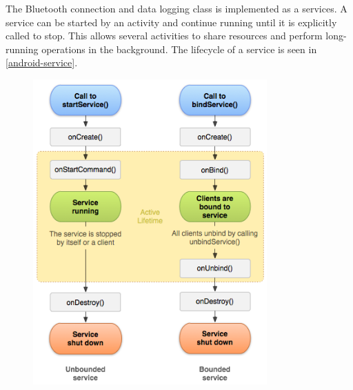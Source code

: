 The Bluetooth connection and data logging class is implemented as a services\cite{android-service}. A service can be started by an activity and continue running until it is explicitly called to stop. This allows several activities to share resources and perform long-running operations in the background. The lifecycle of a service is seen in \autoref{android-service}.
\begin{figure}[H]
\centering
\includegraphics[width=0.8\textwidth]{Figures/service_lifecycle.png}
\label{android-service}
\end{figure}

